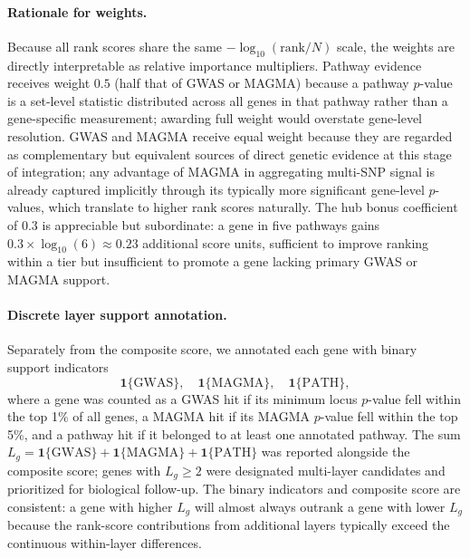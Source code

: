 \paragraph{Rationale for weights.}
Because all rank scores share the same $-\log_{10}(\mathrm{rank}/N)$ scale, the weights
are directly interpretable as relative importance multipliers. Pathway evidence receives
weight $0.5$ (half that of GWAS or MAGMA) because a pathway $p$-value is a set-level
statistic distributed across all genes in that pathway rather than a gene-specific
measurement; awarding full weight would overstate gene-level resolution. GWAS and MAGMA
receive equal weight because they are regarded as complementary but equivalent sources
of direct genetic evidence at this stage of integration; any advantage of MAGMA in
aggregating multi-SNP signal is already captured implicitly through its typically more
significant gene-level $p$-values, which translate to higher rank scores naturally.
The hub bonus coefficient of $0.3$ is appreciable but subordinate: a gene in five
pathways gains $0.3\times\log_{10}(6)\approx 0.23$ additional score units, sufficient
to improve ranking within a tier but insufficient to promote a gene lacking primary
GWAS or MAGMA support.

\paragraph{Discrete layer support annotation.}
Separately from the composite score, we annotated each gene with binary support
indicators
\[
\mathbf{1}\{\mathrm{GWAS}\}, \quad
\mathbf{1}\{\mathrm{MAGMA}\}, \quad
\mathbf{1}\{\mathrm{PATH}\},
\]
where a gene was counted as a GWAS hit if its minimum locus $p$-value fell within the
top 1\% of all genes, a MAGMA hit if its MAGMA $p$-value fell within the top 5\%, and
a pathway hit if it belonged to at least one annotated pathway. The sum
$L_g = \mathbf{1}\{\mathrm{GWAS}\}+\mathbf{1}\{\mathrm{MAGMA}\}+\mathbf{1}\{\mathrm{PATH}\}$
was reported alongside the composite score; genes with $L_g \geq 2$ were designated
multi-layer candidates and prioritized for biological follow-up. The binary indicators
and composite score are consistent: a gene with higher $L_g$ will almost always
outrank a gene with lower $L_g$ because the rank-score contributions from additional
layers typically exceed the continuous within-layer differences.
